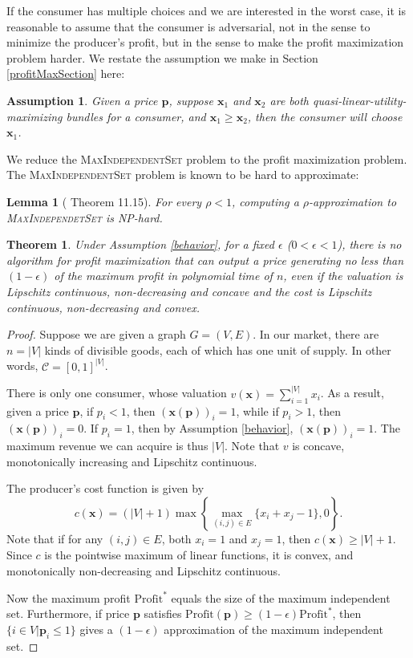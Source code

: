 \documentclass{article}
\newtheorem{theorem}{Theorem}[section]
\newtheorem{lemma}{Lemma}[section]
\newtheorem{assumption}{Assumption}[section]
\begin{document}
If the consumer has multiple choices and we are interested in the worst case, it is reasonable to assume that the consumer is adversarial, not in the sense to minimize the producer's profit, but in the sense to make the profit maximization problem harder. We restate the assumption we make in Section \ref{profitMaxSection} here:
\begingroup
    \def\theassumption{\ref{behavior}}
    \begin{assumption}
        Given a price $\mathbf{p}$, suppose $\mathbf{x}_1$ and $\mathbf{x}_2$ are both quasi-linear-utility-maximizing bundles for a consumer, and $\mathbf{x}_1\ge \mathbf{x}_2$, then the consumer will choose $\mathbf{x}_1$.
    \end{assumption}
    \addtocounter{assumption}{-1}
\endgroup

We reduce the \textsc{MaxIndependentSet} problem to the profit maximization problem. The \textsc{MaxIndependentSet} problem is known to be hard to approximate:
\begin{lemma}[\cite{AB09} Theorem 11.15]
    For every $\rho<1$, computing a $\rho$-approximation to \textsc{MaxIndependetSet} is NP-hard.
\end{lemma}

\begin{theorem}
    Under Assumption \ref{behavior}, for a fixed $\epsilon$ ($0<\epsilon<1$), there is no algorithm for profit maximization that can output a price generating no less than $(1-\epsilon)$ of the maximum profit in polynomial time of $n$, even if the valuation is Lipschitz continuous, non-decreasing and concave and the cost is Lipschitz continuous, non-decreasing and convex.
\end{theorem}
\begin{proof}
    Suppose we are given a graph $G=(V,E)$. In our market, there are $n=|V|$ kinds of divisible goods, each of which has one unit of supply. In other words, $\mathcal{C}=[0,1]^{|V|}$.

    There is only one consumer, whose valuation $v(\mathbf{x})=\sum_{i=1}^{|V|}x_i$. As a result, given a price $\mathbf{p}$, if $p_i<1$, then $(\mathbf{x}(\mathbf{p}))_i=1$, while if $p_i>1$, then $(\mathbf{x}(\mathbf{p}))_i=0$. If $p_i=1$, then by Assumption \ref{behavior}, $(\mathbf{x}(\mathbf{p}))_i=1$. The maximum revenue we can acquire is thus $|V|$. Note that $v$ is concave, monotonically increasing and Lipschitz continuous.

    The producer's cost function is given by
    \begin{equation}
        c(\mathbf{x})=(|V|+1)\max\left\{\max_{(i,j)\in E}\{x_i+x_j-1\},0\right\}.
    \end{equation}
    Note that if for any $(i,j)\in E$, both $x_i=1$ and $x_j=1$, then $c(\mathbf{x})\ge|V|+1$. Since $c$ is the pointwise maximum of linear functions, it is convex, and monotonically non-decreasing and Lipschitz continuous.

    Now the maximum profit $\mathrm{Profit}^*$ equals the size of the maximum independent set. Furthermore, if price $\mathbf{p}$ satisfies $\mathrm{Profit}(\mathbf{p})\ge(1-\epsilon)\mathrm{Profit}^*$, then $\{i\in V|\mathbf{p}_i\le1\}$ gives a $(1-\epsilon)$ approximation of the maximum independent set.
\end{proof}
\end{document}
